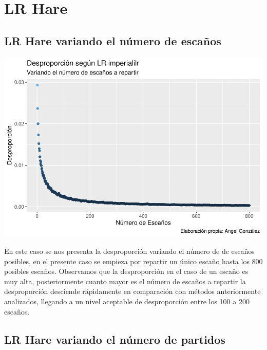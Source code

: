 \documentclass[12pt,a4paper,]{book}
\numberwithin{dummy}{section}
\theoremstyle{ocrenumbox}
\theoremstyle{blacknumex}
\theoremstyle{blacknumbox}
\theoremstyle{ocrenum}
\theoremstyle{ocrenum}
\begin{document}
\hypertarget{lr-hare}{%
\section{LR Hare}\label{lr-hare}}

\hypertarget{lr-hare-variando-el-nuxfamero-de-escauxf1os}{%
\subsection{LR Hare variando el número de
escaños}\label{lr-hare-variando-el-nuxfamero-de-escauxf1os}}

\begin{center}\includegraphics[width=0.95\linewidth]{figurasR/unnamed-chunk-51-1} \end{center}

En este caso se nos presenta la desproporción variando el número de de
escaños posibles, en el presente caso se empieza por repartir un único
escaño hasta los 800 posibles escaños. Observamos que la desproporción
en el caso de un escaño es muy alta, posteriormente cuanto mayor es el
número de escaños a repartir la desproporción desciende rápidamente en
comparación con métodos anteriormente analizados, llegando a un nivel
aceptable de desproporción entre los 100 a 200 escaños.

\hypertarget{lr-hare-variando-el-nuxfamero-de-partidos}{%
\subsection{LR Hare variando el número de
partidos}\label{lr-hare-variando-el-nuxfamero-de-partidos}}
\end{document}
